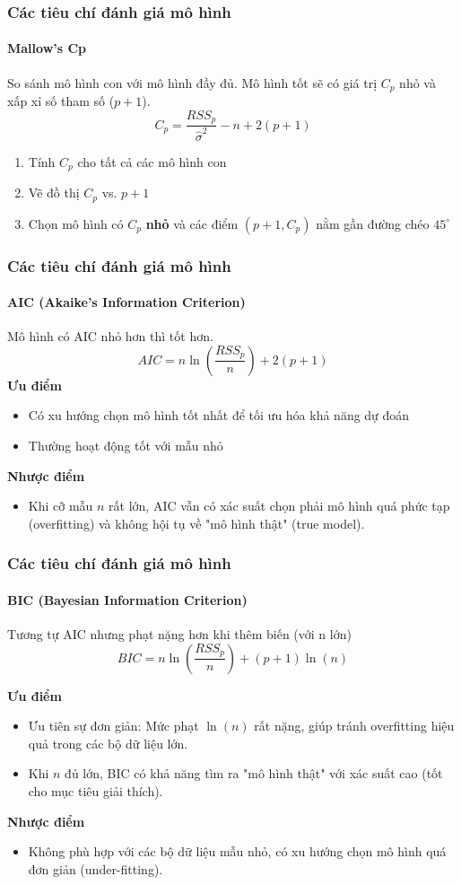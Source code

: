 \begin{frame}
    \frametitle{Các tiêu chí đánh giá mô hình}
    \framesubtitle{Mallow's Cp}
    So sánh mô hình con với mô hình đầy đủ. Mô hình tốt sẽ có giá trị $C_p$ nhỏ và xấp xỉ số tham số ($p+1$).
    \[C_p = \frac{RSS_p}{\widehat{\sigma}^2} - n + 2(p+1)\]
    \begin{enumerate}
        \item Tính $C_p$ cho tất cả các mô hình con
        \item Vẽ đồ thị $C_p$ vs. $p+1$
        \item Chọn mô hình có $C_p$ \textbf{nhỏ} và các điểm $(p+1,C_p)$ nằm gần đường chéo $45^{\circ}$
    \end{enumerate}
\end{frame}

\begin{frame}
    \frametitle{Các tiêu chí đánh giá mô hình}
    \framesubtitle{AIC (Akaike's Information Criterion)}
    Mô hình có AIC nhỏ hơn thì tốt hơn.
    \[ AIC = n \ln(\frac{RSS_p}{n}) + 2(p+1) \]
    \textbf{Ưu điểm}
    \begin{itemize}
        \item Có xu hướng chọn mô hình tốt nhất để tối ưu hóa khả năng dự đoán 
        \item Thường hoạt động tốt với mẫu nhỏ
    \end{itemize}
    
    \textbf{Nhược điểm}
    \begin{itemize}
        \item Khi cỡ mẫu $n$ rất lớn, AIC vẫn có xác suất chọn phải mô hình quá phức tạp (overfitting) và không hội tụ về "mô hình thật" (true model).
    \end{itemize}
\end{frame}
\begin{frame}
    \frametitle{Các tiêu chí đánh giá mô hình}
    \framesubtitle{BIC (Bayesian Information Criterion)}
    Tương tự AIC nhưng phạt nặng hơn khi thêm biến (với n lớn)
    \[ BIC = n \ln\left(\frac{RSS_p}{n}\right) + (p+1)\ln(n) \]
    
    \textbf{Ưu điểm}
    \begin{itemize}
        \item Ưu tiên sự đơn giản: Mức phạt $\ln(n)$ rất nặng, giúp tránh overfitting hiệu quả trong các bộ dữ liệu lớn.
        \item Khi $n$ đủ lớn, BIC có khả năng tìm ra "mô hình thật" với xác suất cao (tốt cho mục tiêu giải thích).
    \end{itemize}
    
    \textbf{Nhược điểm}
    \begin{itemize}
        \item Không phù hợp với các bộ dữ liệu mẫu nhỏ, có xu hướng chọn mô hình quá đơn giản (under-fitting).
    \end{itemize}
\end{frame}



